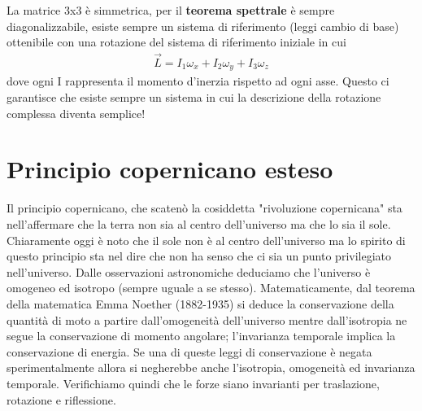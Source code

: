 La matrice 3x3 è simmetrica, per il \textbf{teorema spettrale} è sempre diagonalizzabile, esiste sempre un sistema di riferimento (leggi cambio di base) ottenibile con una rotazione del sistema di riferimento iniziale in cui
\begin{align*}
	\vec{L} = I_1 \omega_x + I_2 \omega_y + I_3 \omega_z
\end{align*}
dove ogni I rappresenta il momento d'inerzia rispetto ad ogni asse. Questo ci garantisce che esiste sempre un sistema in cui la descrizione della rotazione complessa diventa semplice!
\section{Principio copernicano esteso}
Il principio copernicano, che scatenò la cosiddetta "rivoluzione copernicana" sta nell'affermare che la terra non sia al centro dell'universo ma che lo sia il sole. Chiaramente oggi è noto che il sole non è al centro dell'universo ma lo spirito di questo principio sta nel dire che non ha senso che ci sia un punto privilegiato nell'universo. Dalle osservazioni astronomiche deduciamo che l'universo è omogeneo ed isotropo (sempre uguale a se stesso). Matematicamente, dal teorema della matematica Emma Noether (1882-1935) si deduce la conservazione della quantità di moto a partire dall'omogeneità dell'universo mentre dall'isotropia ne segue la conservazione di momento angolare; l'invarianza temporale implica la conservazione di energia. Se una di queste leggi di conservazione è negata sperimentalmente allora si negherebbe anche l'isotropia, omogeneità ed invarianza temporale. Verifichiamo quindi che le forze siano invarianti per traslazione, rotazione e riflessione.
